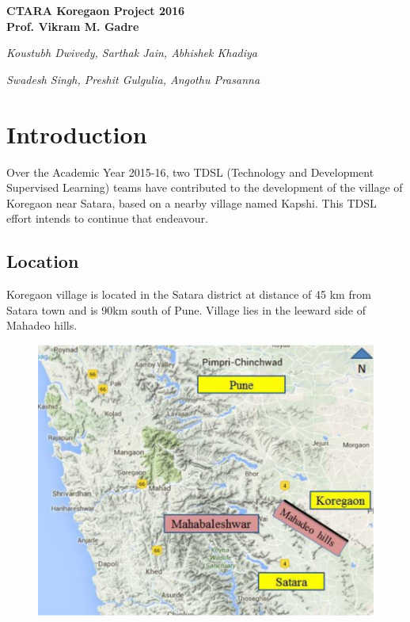 \documentclass{article}
\begin{document}
\begin{titlepage}
   \begin{center}
      \Large\textbf{CTARA Koregaon Project 2016}\\
      
      \large\textbf{Prof. Vikram M. Gadre}
      
      \large\textit{Koustubh Dwivedy, Sarthak Jain, Abhishek Khadiya}
      
      \large\textit{Swadesh Singh, Preshit Gulgulia, Angothu Prasanna}
   \end{center}
\end{titlepage}

\tableofcontents

\newpage
\section{Introduction}
Over the Academic Year 2015-16, two TDSL (Technology and Development Supervised Learning) teams have contributed to the development of the village of Koregaon near Satara, based on a nearby village named Kapshi. This TDSL effort intends to continue that endeavour.

\subsection{Location}
Koregaon village is located in the Satara district at distance of 45 km from Satara town and is 90km
south of Pune. Village lies in the leeward side of Mahadeo hills.
\begin{figure}[h]
\begin{center}
  \includegraphics[scale=0.4]{images/location.jpg}
\end{center}
\end{figure}
\end{document}
